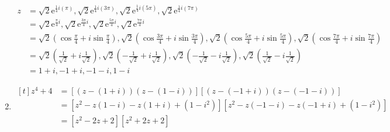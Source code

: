 \documentclass[11pt,a4paper]{book}
\begin{document}
\begin{example}
\begin{enumerate}[label=(\alph*)]
\begin{align*}
z & =\sqrt{2}\mathrm{e}^{\frac{1}{4}i\left(\pi\right)},\sqrt{2}\mathrm{e}^{\frac{1}{4}i\left(3\pi\right)},\sqrt{2}\mathrm{e}^{\frac{1}{4}i\left(5\pi\right)},\sqrt{2}\mathrm{e}^{\frac{1}{4}i\left(7\pi\right)}\\
 & =\sqrt{2}\mathrm{e}^{\frac{\pi}{4}i},\sqrt{2}\mathrm{e}^{\frac{3\pi}{4}i},\sqrt{2}\mathrm{e}^{\frac{5\pi}{4}i},\sqrt{2}\mathrm{e}^{\frac{7\pi}{4}i}\\
 & =\sqrt{2}\left(\cos\frac{\pi}{4}+i\sin\frac{\pi}{4}\right),\sqrt{2}\left(\cos\frac{3\pi}{4}+i\sin\frac{3\pi}{4}\right),\sqrt{2}\left(\cos\frac{5\pi}{4}+i\sin\frac{5\pi}{4}\right),\sqrt{2}\left(\cos\frac{7\pi}{4}+i\sin\frac{7\pi}{4}\right)\\
 & =\sqrt{2}\left(\frac{1}{\sqrt{2}}+i\frac{1}{\sqrt{2}}\right),\sqrt{2}\left(-\frac{1}{\sqrt{2}}+i\frac{1}{\sqrt{2}}\right),\sqrt{2}\left(-\frac{1}{\sqrt{2}}-i\frac{1}{\sqrt{2}}\right),\sqrt{2}\left(\frac{1}{\sqrt{2}}-i\frac{1}{\sqrt{2}}\right)\\
 & =1+i,-1+i,-1-i,1-i
\end{align*}


\item
$
\begin{aligned}[t]
z^{4}+4 & =\left[\left(z-\left(1+i\right)\right)\left(z-\left(1-i\right)\right)\right]\left[\left(z-\left(-1+i\right)\right)\left(z-\left(-1-i\right)\right)\right]\\
 & =\left[z^{2}-z\left(1-i\right)-z\left(1+i\right)+\left(1-i^{2}\right)\right]\left[z^{2}-z\left(-1-i\right)-z\left(-1+i\right)+\left(1-i^{2}\right)\right]\\
 & =\left[z^{2}-2z+2\right]\left[z^{2}+2z+2\right]
\end{aligned}
$

\end{enumerate}
\end{example}
\end{document}
